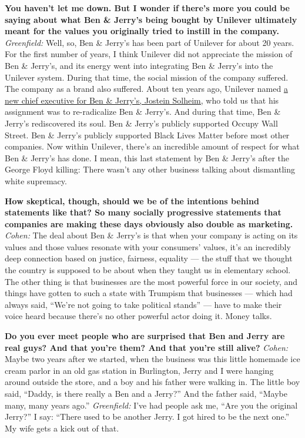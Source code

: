 \textbf{You haven't let me down. But I wonder if there's more you could
be saying about what Ben \& Jerry's being bought by Unilever ultimately
meant for the values you originally tried to instill in the company.}
\emph{Greenfield:} Well, so, Ben \& Jerry's has been part of Unilever
for about 20 years. For the first number of years, I think Unilever did
not appreciate the mission of Ben \& Jerry's, and its energy went into
integrating Ben \& Jerry's into the Unilever system. During that time,
the social mission of the company suffered. The company as a brand also
suffered. About ten years ago, Unilever named
\href{http://nytimes.com\#tooltip-13}{a new chief executive for Ben \&
Jerry's, Jostein Solheim,} who told us that his assignment was to
re-radicalize Ben \& Jerry's. And during that time, Ben \& Jerry's
rediscovered its soul. Ben \& Jerry's publicly supported Occupy Wall
Street. Ben \& Jerry's publicly supported Black Lives Matter before most
other companies. Now within Unilever, there's an incredible amount of
respect for what Ben \& Jerry's has done. I mean, this last statement by
Ben \& Jerry's after the George Floyd killing: There wasn't any other
business talking about dismantling white supremacy.

\textbf{How skeptical, though, should we be of the intentions behind
statements like that? So many socially progressive statements that
companies are making these days obviously also double as marketing.}
\emph{Cohen:} The deal about Ben \& Jerry's is that when your company is
acting on its values and those values resonate with your consumers'
values, it's an incredibly deep connection based on justice, fairness,
equality --- the stuff that we thought the country is supposed to be
about when they taught us in elementary school. The other thing is that
businesses are the most powerful force in our society, and things have
gotten to such a state with Trumpism that businesses --- which had
always said, ``We're not going to take political stands'' --- have to
make their voice heard because there's no other powerful actor doing it.
Money talks.

\textbf{Do you ever meet people who are surprised that Ben and Jerry are
real guys? And that you're them? And that you're still alive?}
\emph{Cohen:} Maybe two years after we started, when the business was
this little homemade ice cream parlor in an old gas station in
Burlington, Jerry and I were hanging around outside the store, and a boy
and his father were walking in. The little boy said, ``Daddy, is there
really a Ben and a Jerry?'' And the father said, ``Maybe many, many
years ago.'' \emph{Greenfield:} I've had people ask me, ``Are you the
original Jerry?'' I say: ``There used to be another Jerry. I got hired
to be the next one.'' My wife gets a kick out of that.

